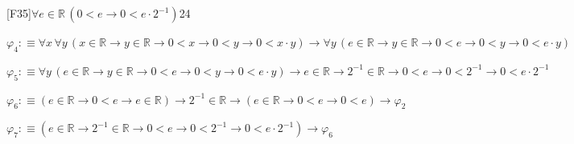 \begin{fullproof}{[F35]}{$\forall e \in \mathbb{R}\,(0 < e \to 0 < e \cdot 2^{-1})$}{24}
\begin{abbrevlist}
\item $\varphi_{4} :\equiv \forall x\,\forall y\,(x \in \mathbb{R} \to y \in \mathbb{R} \to 0 < x \to 0 < y \to 0 < x \cdot y) \to \forall y\,(e \in \mathbb{R} \to y \in \mathbb{R} \to 0 < e \to 0 < y \to 0 < e \cdot y)$
\item $\varphi_{5} :\equiv \forall y\,(e \in \mathbb{R} \to y \in \mathbb{R} \to 0 < e \to 0 < y \to 0 < e \cdot y) \to e \in \mathbb{R} \to 2^{-1} \in \mathbb{R} \to 0 < e \to 0 < 2^{-1} \to 0 < e \cdot 2^{-1}$
\item $\varphi_{6} :\equiv (e \in \mathbb{R} \to 0 < e \to e \in \mathbb{R}) \to 2^{-1} \in \mathbb{R} \to (e \in \mathbb{R} \to 0 < e \to 0 < e) \to \varphi_{2}$
\item $\varphi_{7} :\equiv (e \in \mathbb{R} \to 2^{-1} \in \mathbb{R} \to 0 < e \to 0 < 2^{-1} \to 0 < e \cdot 2^{-1}) \to \varphi_{6}$
\end{abbrevlist}
\end{fullproof}
